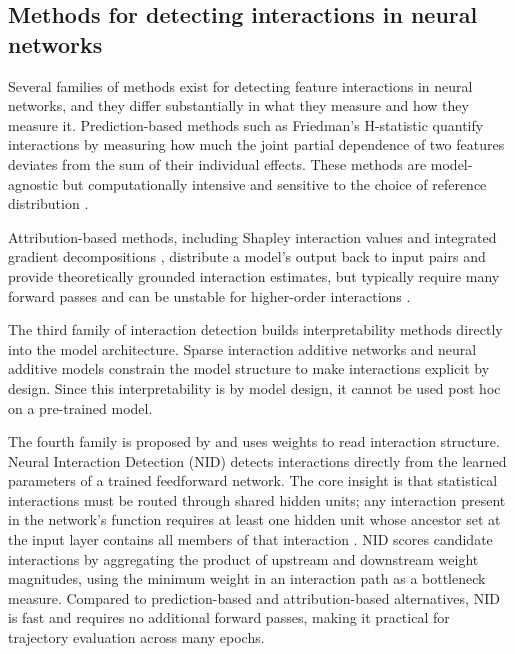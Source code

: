 \documentclass{article}
\begin{document}
\subsection{Methods for detecting interactions in neural networks}

Several families of methods exist for detecting feature interactions in neural networks, and they differ substantially in what they measure and how they measure it. Prediction-based methods such as Friedman's H-statistic \citep{friedman2008predictive} quantify interactions by measuring how much the joint partial dependence of two features deviates from the sum of their individual effects. These methods are model-agnostic but computationally intensive and sensitive to the choice of reference distribution \citep{friedman2008predictive}.

Attribution-based methods, including Shapley interaction values and integrated gradient decompositions \citep{lundberg2017unified}, distribute a model's output back to input pairs and provide theoretically grounded interaction estimates, but typically require many forward passes and can be unstable for higher-order interactions \citep{enouen2023sparseinteractionadditivenetworks}.

The third family of interaction detection builds interpretability methods directly into the model architecture. Sparse interaction additive networks \citep{enouen2023sparseinteractionadditivenetworks} and neural additive models \citep{agarwal2021neural} constrain the model structure to make interactions explicit by design. Since this interpretability is by model design, it cannot be used post hoc on a pre-trained model.

The fourth family is proposed by \cite{tsang2017detecting} and uses weights to read interaction structure. Neural Interaction Detection (NID) detects interactions directly from the learned parameters of a trained feedforward network. The core insight is that statistical interactions must be routed through shared hidden units; any interaction present in the network's function requires at least one hidden unit whose ancestor set at the input layer contains all members of that interaction \citep{tsang2017detecting}. NID scores candidate interactions by aggregating the product of upstream and downstream weight magnitudes, using the minimum weight in an interaction path as a bottleneck measure. Compared to prediction-based and attribution-based alternatives, NID is fast and requires no additional forward passes, making it practical for trajectory evaluation across many epochs.
\end{document}
